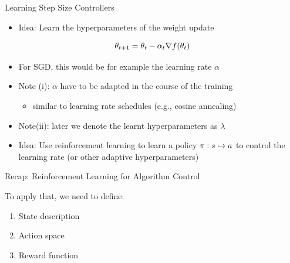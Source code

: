 	
\begin{frame}[c]{Learning Step Size Controllers }

\begin{itemize}
\item \alert{Idea:} Learn the hyperparameters of the weight update 
\end{itemize}

\begin{equation}
\theta_{t+1} = \theta_t - \alpha_t \nabla f(\theta_t) \nonumber
\end{equation}

\begin{itemize}
\pause
\item For SGD, this would be for example the learning rate $\alpha$
\pause
\item \alert{Note (i)}: $\alpha$ have to be adapted in the course of the training
\begin{itemize}
\item similar to learning rate schedules (e.g., cosine annealing)
\end{itemize}
\pause
\item \alert{Note(ii)}: later we denote the learnt hyperparameters as $\lambda$
\medskip
\pause
\item \alert{Idea:} Use reinforcement learning to learn a policy $\pi: s \mapsto a$ to control the learning rate (or other adaptive hyperparameters)
\end{itemize}



\end{frame}
\begin{frame}[c]{Recap: Reinforcement Learning for Algorithm Control}

\centering


\bigskip
To apply that, we need to define:
\begin{enumerate}
	\item State description
	\item Action space
	\item Reward function
\end{enumerate}

\end{frame}

